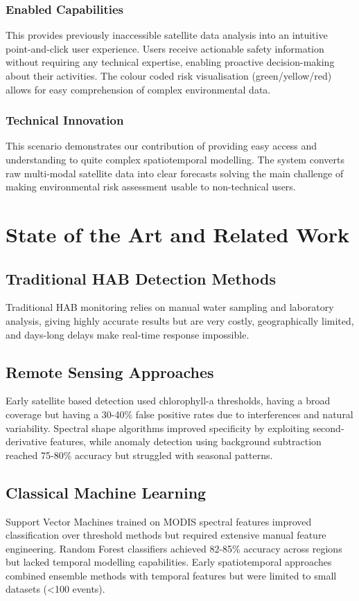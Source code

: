 \documentclass[conference]{IEEEtran}
\begin{document}
\subsubsection{Enabled Capabilities}
This provides previously inaccessible satellite data analysis into an intuitive point-and-click user experience. Users receive actionable safety information without requiring any technical expertise, enabling proactive decision-making about their activities. The colour coded risk visualisation (green/yellow/red) allows for easy comprehension of complex environmental data.
\subsubsection{Technical Innovation}
This scenario demonstrates our contribution of providing easy access and understanding to quite complex spatiotemporal modelling. The system converts raw multi-modal satellite data into clear forecasts solving the main challenge of making environmental risk assessment usable to non-technical users.

\section{State of the Art and Related Work}


\subsection{Traditional HAB Detection Methods}
Traditional HAB monitoring relies on manual water sampling and laboratory analysis, giving highly accurate results but are very costly, geographically limited, and days-long delays make real-time response impossible.

\subsection{Remote Sensing Approaches}
Early satellite based detection used chlorophyll-a thresholds, having a broad coverage but having a 30-40\% false positive rates due to interferences and natural variability. Spectral shape algorithms improved specificity by exploiting second-derivative features, while anomaly detection using background subtraction reached 75-80\% accuracy but struggled with seasonal patterns.

\subsection{Classical Machine Learning}
Support Vector Machines trained on MODIS spectral features improved classification over threshold methods but required extensive manual feature engineering. Random Forest classifiers achieved 82-85\% accuracy across regions but lacked temporal modelling capabilities. Early spatiotemporal approaches combined ensemble methods with temporal features but were limited to small datasets (<100 events).
\end{document}
